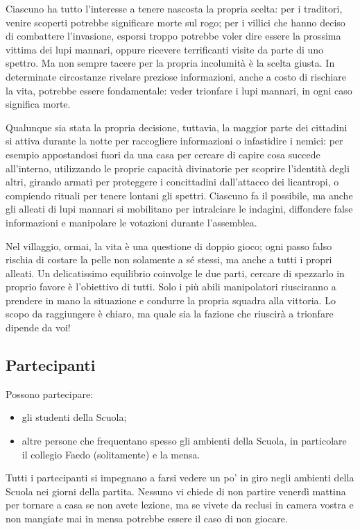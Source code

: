 \documentclass[a4paper,10pt]{article}
\begin{document}
Ciascuno ha tutto l'interesse a tenere nascosta la propria scelta: per i traditori, venire scoperti potrebbe significare morte sul rogo; per i villici che hanno deciso di combattere l'invasione, esporsi troppo potrebbe voler dire essere la prossima vittima dei lupi mannari, oppure ricevere terrificanti visite da parte di uno spettro. Ma non sempre tacere per la propria incolumità è la scelta giusta. In determinate circostanze rivelare preziose informazioni, anche a costo di rischiare la vita, potrebbe essere fondamentale: veder trionfare i lupi mannari, in ogni caso significa morte.

Qualunque sia stata la propria decisione, tuttavia, la maggior parte dei cittadini si attiva durante la notte per raccogliere informazioni o infastidire i nemici: per esempio appostandosi fuori da una casa per cercare di capire cosa succede all'interno, utilizzando le proprie capacità divinatorie per scoprire l'identità degli altri, girando armati per proteggere i concittadini dall'attacco dei licantropi, o compiendo rituali per tenere lontani gli spettri. Ciascuno fa il possibile, ma anche gli alleati di lupi mannari si mobilitano per intralciare le indagini, diffondere false informazioni e manipolare le votazioni durante l'assemblea.

Nel villaggio, ormai, la vita è una questione di doppio gioco; ogni passo falso rischia di costare la pelle non solamente a sé stessi, ma anche a tutti i propri alleati. Un delicatissimo equilibrio coinvolge le due parti, cercare di spezzarlo in proprio favore è l'obiettivo di tutti. Solo i più abili manipolatori riusciranno a prendere in mano la situazione e condurre la propria squadra alla vittoria. Lo scopo da raggiungere è chiaro, ma quale sia la fazione che riuscirà a trionfare dipende da voi!

\subsection{Partecipanti}

Possono partecipare:

\begin{itemize}
    \item gli studenti della Scuola;
    \item altre persone che frequentano spesso gli ambienti della Scuola, in particolare il collegio Faedo (solitamente) e la mensa.
\end{itemize}

Tutti i partecipanti si impegnano a farsi vedere un po' in giro negli ambienti della Scuola nei giorni della partita. Nessuno vi chiede di non partire venerdì mattina per tornare a casa se non avete lezione, ma se vivete da reclusi in camera vostra e non mangiate mai in mensa potrebbe essere il caso di non giocare.
\end{document}
